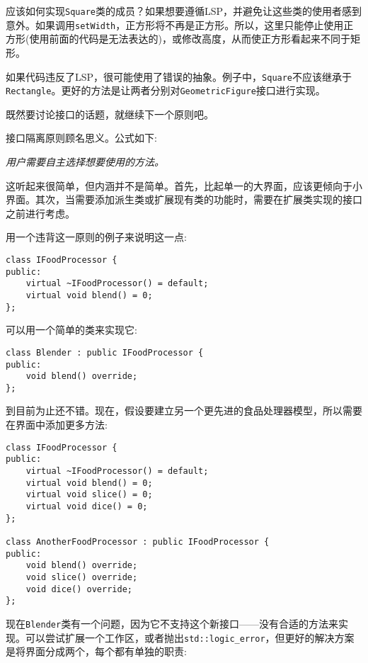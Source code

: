 应该如何实现\texttt{Square}类的成员？如果想要遵循LSP，并避免让这些类的使用者感到意外。如果调用\texttt{setWidth}，正方形将不再是正方形。所以，这里只能停止使用正方形(使用前面的代码是无法表达的)，或修改高度，从而使正方形看起来不同于矩形。

如果代码违反了LSP，很可能使用了错误的抽象。例子中，\texttt{Square}不应该继承于\texttt{Rectangle}。更好的方法是让两者分别对\texttt{GeometricFigure}接口进行实现。

既然要讨论接口的话题，就继续下一个原则吧。


接口隔离原则顾名思义。公式如下:

\noindent
\hspace*{0.8cm}\textit{用户需要自主选择想要使用的方法。}

这听起来很简单，但内涵并不是简单。首先，比起单一的大界面，应该更倾向于小界面。其次，当需要添加派生类或扩展现有类的功能时，需要在扩展类实现的接口之前进行考虑。

用一个违背这一原则的例子来说明这一点:

\begin{lstlisting}[style=styleCXX]
class IFoodProcessor {
public:
	virtual ~IFoodProcessor() = default;
	virtual void blend() = 0;
};
\end{lstlisting}

可以用一个简单的类来实现它:

\begin{lstlisting}[style=styleCXX]
class Blender : public IFoodProcessor {
public:
	void blend() override;
};
\end{lstlisting}

到目前为止还不错。现在，假设要建立另一个更先进的食品处理器模型，所以需要在界面中添加更多方法:

\begin{lstlisting}[style=styleCXX]
class IFoodProcessor {
public:
	virtual ~IFoodProcessor() = default;
	virtual void blend() = 0;
	virtual void slice() = 0;
	virtual void dice() = 0;
};

class AnotherFoodProcessor : public IFoodProcessor {
public:
	void blend() override;
	void slice() override;
	void dice() override;
};
\end{lstlisting}

现在\texttt{Blender}类有一个问题，因为它不支持这个新接口——没有合适的方法来实现。可以尝试扩展一个工作区，或者抛出\texttt{std::logic\_error}，但更好的解决方案是将界面分成两个，每个都有单独的职责:

